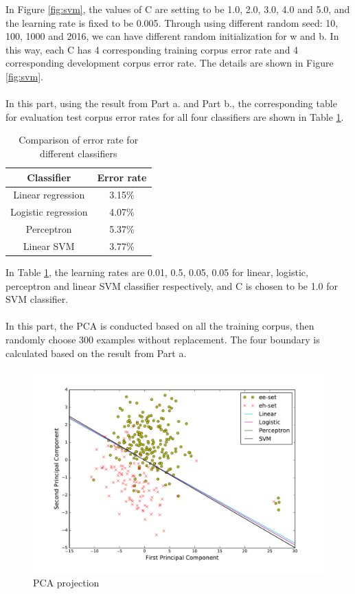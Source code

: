 In Figure \ref{fig:svm}, the values of C are setting to be 1.0, 2.0, 3.0, 4.0 and 5.0, and the learning rate is fixed to be 0.005. Through using different random seed: 10, 100, 1000 and 2016, we can have different random initialization for w and b. In this way, each C has 4 corresponding training corpus error rate and 4 corresponding development corpus error rate. The details are shown in Figure \ref{fig:svm}.\\


\\

In this part, using the result from Part a. and Part b., the corresponding table for evaluation test corpus error rates for all four classifiers are shown in Table \ref{table:error}.

\begin{table}[H]
	\centering
	\caption{Comparison of error rate for different classifiers}
	\label{table:error}	
	\begin{tabular}{c | c}
		\hline \hline
		Classifier  &	Error rate \\[0.1cm]
		\hline
		Linear regression		&	3.15\%	\\[0.1cm]
		Logistic regression		&	4.07\%	\\[0.1cm]
		Perceptron				&	5.37\%	\\[0.1cm]
		Linear SVM				&	3.77\%	\\[0.1cm]
		\hline	
	\end{tabular}
\end{table}

In Table \ref{table:error}, the learning rates are 0.01, 0.5, 0.05, 0.05 for linear, logistic, perceptron and linear SVM classifier respectively, and C is chosen to be 1.0 for SVM classifier.\\


\\

In this part, the PCA is conducted based on all the training corpus, then randomly choose 300 examples without replacement. The four boundary is calculated based on the result from Part a.

\begin{figure}[H]
\centering
\includegraphics[width=1.0\textwidth]{./figures/PCA.pdf}
\caption{\label{fig:pca} PCA projection}
\end{figure}

